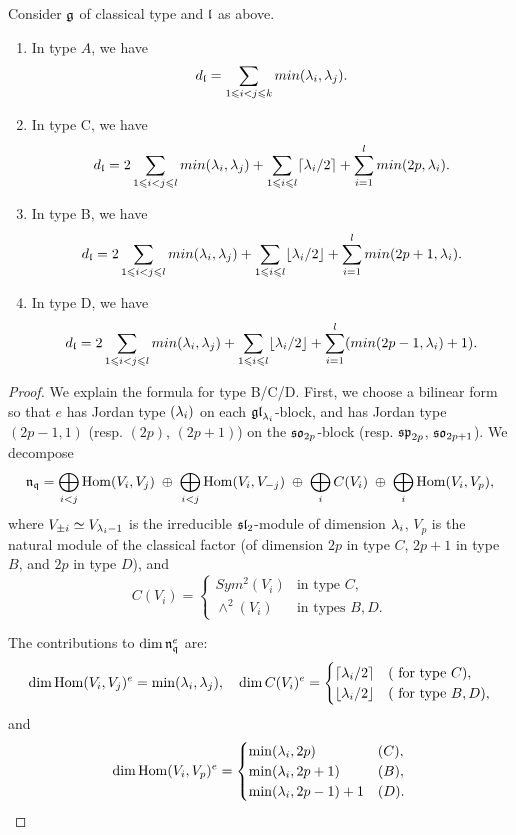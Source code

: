 \documentclass[11pt]{article}
\numberwithin{equation}{section}
\begin{document}
\begin{appendix}
\begin{lem}\label{computing  dl} 
Consider $\mathfrak{g}$ of classical type and $\mathfrak{l}$ as above.
    \begin{enumerate} 
        \item In type $A$, we have $$d_{\mathfrak{l}}= \sum_{1\leqslant i< j\leqslant k} min(\lambda_i,\lambda_j).$$
        \item In type C, we have $$d_{\mathfrak{l}}= 2\sum_{1\leqslant i< j\leqslant l} min(\lambda_i,\lambda_j)+ \sum_{1\leqslant i\leqslant l}\lceil \lambda_i/2\rceil+ \sum_{i=1}^l min(2p,\lambda_i).$$
        \item In type B, we have $$d_{\mathfrak{l}}= 2\sum_{1\leqslant i< j\leqslant l} min(\lambda_i,\lambda_j)+ \sum_{1\leqslant i\leqslant l}\lfloor \lambda_i/2\rfloor+ \sum_{i=1}^l min(2p+1,\lambda_i).$$
        \item In type D, we have $$d_{\mathfrak{l}}= 2\sum_{1\leqslant i< j\leqslant l} min(\lambda_i,\lambda_j)+ \sum_{1\leqslant i\leqslant l}\lfloor \lambda_i/2\rfloor+ \sum_{i=1}^l (min(2p-1,\lambda_i)+1).$$
    \end{enumerate}
\end{lem}
\begin{proof}
    We explain the formula for type B/C/D. First, we choose a bilinear form so that $e$ has Jordan type $(\lambda_i)$ on each $\mathfrak{gl}_{\lambda_i}$-block, and has Jordan type $(2p-1,1)$ (resp. $(2p)$, $(2p+1)$) on the $\mathfrak{so}_{2p}$-block (resp. $\mathfrak{sp}_{2p}$, $\mathfrak{so}_{2p+1}$). We decompose
\[
\mathfrak{n}_{\mathfrak{q}}
=
\bigoplus_{i< j}\operatorname{Hom}(V_i,V_j) \;\oplus\; \bigoplus_{i< j}\operatorname{Hom}(V_i,V_{-j})
\;\oplus\;
\bigoplus_i C(V_i)
\;\oplus\;
\bigoplus_i \operatorname{Hom}(V_i,V_p),
\]
where $V_{\pm i}\simeq V_{\lambda_i-1}$ is the irreducible $\mathfrak{sl}_2$-module of dimension $\lambda_i$, $V_p$ is the natural module of the classical factor (of dimension $2p$ in type $C$, $2p+1$ in type $B$, and $2p$ in type $D$), and
\[
C(V_i)=
\begin{cases}
Sym^2(V_i) & \text{in type } C,\\
\wedge^2(V_i) & \text{in types } B,D.
\end{cases}
\]

The contributions to $\dim \mathfrak{n}_{\mathfrak{q}}^e$ are:
\[
\dim \operatorname{Hom}(V_i,V_j)^e = \min(\lambda_i,\lambda_j),\quad
\dim C(V_i)^e =
\begin{cases}
\lceil \lambda_i/2\rceil & (\text{ for type } C),\\
\lfloor \lambda_i/2\rfloor & (\text{ for type } B,D),
\end{cases}
\]
and
\[
\dim \operatorname{Hom}(V_i,V_p)^e =
\begin{cases}
\min(\lambda_i,2p) & (C),\\
\min(\lambda_i,2p+1) & (B),\\
\min(\lambda_i,2p-1)+1 & (D).
\end{cases}
\]


\end{proof}
\end{appendix}
\end{document}

